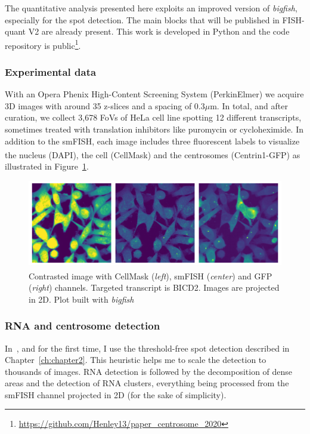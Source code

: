 The quantitative analysis presented here exploits an improved version of \emph{bigfish}, especially for the spot detection.
The main blocks that will be published in FISH-quant V2 are already present.
This work is developed in Python and the code repository is public\footnote{\url{https://github.com/Henley13/paper_centrosome_2020}}.

\subsubsection{Experimental data}

With an Opera Phenix High-Content Screening System (PerkinElmer) we acquire 3D images with around 35 z-slices and a spacing of 0.3$\mu$m.
In total, and after curation, we collect 3,678 \ac{FoV}s of HeLa cell line spotting 12 different transcripts, sometimes treated with translation inhibitors like puromycin or cycloheximide.
In addition to the \ac{smFISH}, each image includes three fluorescent labels to visualize the nucleus (DAPI), the cell (CellMask\textsuperscript{\texttrademark}) and the centrosomes (Centrin1-\ac{GFP}) as illustrated in Figure~\ref{fig:fov_adham}.

\begin{figure}[]
    \centering
    \includegraphics[width=\textwidth]{figures/chapter5/FoV_BICD2}
    \caption[Contrasted image with CellMask\textsuperscript{\texttrademark}, smFISH and GFP channels]{Contrasted image with CellMask\textsuperscript{\texttrademark} (\textit{left}), smFISH (\textit{center}) and GFP (\textit{right}) channels.
	Targeted transcript is BICD2.
	Images are projected in 2D.
	Plot built with \emph{bigfish}}
    \label{fig:fov_adham}
\end{figure}

\subsubsection{RNA and centrosome detection}

In~\cite{safieddine_choreography_2021}, and for the first time, I use the threshold-free spot detection described in Chapter~\ref{ch:chapter2}.
This heuristic helps me to scale the detection to thousands of images.
\ac{RNA} detection is followed by the decomposition of dense areas and the detection of \ac{RNA} clusters, everything being processed from the \ac{smFISH} channel projected in 2D (for the sake of simplicity).

